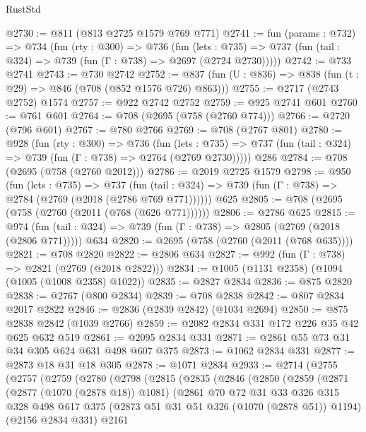 \begin{lexlean}{RustStd}
\begin{coremodule}
@2730 := @811 (@813 @2725 @1579 @769 @771)
@2741 := fun (params : @732) =>
  @734
    (fun (rty : @300) =>
    @736
      (fun (lets : @735) =>
      @737 (fun (tail : @324) => @739 (fun (Γ : @738) => @2697 (@2724 @2730)))))
@2742 := @733 @2741
@2743 := @730 @2742
@2752 := @837 (fun (U : @836) => @838 (fun (t : @29) => @846 (@708 (@852 @1576 @726) @863)))
@2755 := @2717 (@2743 @2752) @1574
@2757 := @922 @2742 @2752
@2759 := @925 @2741 @601
@2760 := @761 @601
@2764 := @708 (@2695 (@758 (@2760 @774)))
@2766 := @2720 (@796 @601)
@2767 := @780 @2766
@2769 := @708 (@2767 @801)
@2780 := @928
    (fun (rty : @300) =>
    @736
      (fun (lets : @735) =>
      @737 (fun (tail : @324) => @739 (fun (Γ : @738) => @2764 (@2769 @2730)))))
    @286
@2784 := @708 (@2695 (@758 (@2760 @2012)))
@2786 := @2019 @2725 @1579
@2798 := @950
    (fun (lets : @735) =>
    @737 (fun (tail : @324) => @739 (fun (Γ : @738) => @2784 (@2769 (@2018 (@2786 @769 @771))))))
    @625
@2805 := @708 (@2695 (@758 (@2760 (@2011 (@768 (@626 @771))))))
@2806 := @2786 @625
@2815 := @974
    (fun (tail : @324) => @739 (fun (Γ : @738) => @2805 (@2769 (@2018 (@2806 @771)))))
    @634
@2820 := @2695 (@758 (@2760 (@2011 (@768 @635))))
@2821 := @708 @2820
@2822 := @2806 @634
@2827 := @992 (fun (Γ : @738) => @2821 (@2769 (@2018 @2822)))
@2834 := @1005 (@1131 @2358) (@1094 (@1005 (@1008 @2358) @1022))
@2835 := @2827 @2834
@2836 := @875 @2820
@2838 := @2767 (@800 @2834)
@2839 := @708 @2838
@2842 := @807 @2834 @2017 @2822
@2846 := @2836 (@2839 @2842) (@1034 @2694)
@2850 := @875 @2838 @2842 (@1039 @2766)
@2859 := @2082 @2834 @331 @172 @226 @35 @42 @625 @632 @519
@2861 := @2095 @2834 @331
@2871 := @2861 @55 @73 @31 @34 @305 @624 @631 @498 @607 @375
@2873 := @1062 @2834 @331
@2877 := @2873 @18 @31 @18 @305
@2878 := @1071 @2834
@2933 := @2714
    (@2755
      (@2757
        (@2759
          (@2780
            (@2798
              (@2815
                (@2835
                  (@2846
                    (@2850
                      (@2859
                        (@2871
                          (@2877 (@1070 (@2878 @18)) @1081)
                          (@2861
                            @70
                            @72
                            @31
                            @33
                            @326
                            @315
                            @328
                            @498
                            @617
                            @375
                            (@2873 @51 @31 @51 @326 (@1070 (@2878 @51)) @1194)
                            (@2156 @2834 @331)
                            @2161

\end{coremodule}
\end{lexlean}
